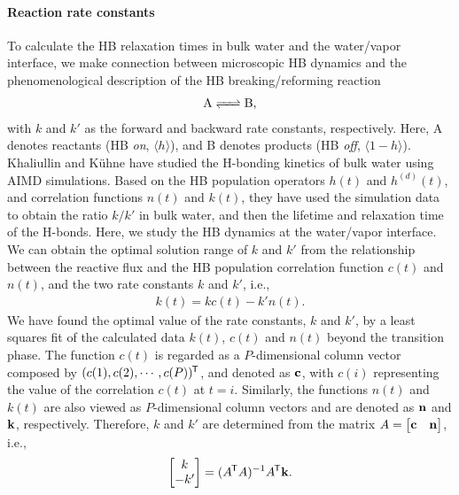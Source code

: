 \paragraph{Reaction rate constants}
To calculate the HB relaxation times in bulk water and the water/vapor interface, we
make connection between microscopic HB dynamics and the phenomenological description of the HB breaking/reforming reaction
\begin{align}
\ce{A <=> B},
\end{align}
with $k$ and $k'$ as the forward and backward rate constants, respectively.
Here, A denotes reactants (HB \emph{on}, $\langle h\rangle$), and B denotes products (HB \emph{off}, $\langle 1-h\rangle$)\cite{Chandra2000}.
Khaliullin and K\"uhne have studied the H-bonding kinetics of bulk water using AIMD simulations\cite{Khaliullin2013}.
Based on the HB population operators $h(t)$ and $h^{(d)}(t)$, and correlation functions $n(t)$ and $k(t)$, they have used the simulation data 
to obtain the ratio $k/k'$ in bulk water, and then the lifetime and relaxation time 
of the H-bonds.  
Here, we study the HB dynamics at the water/vapor interface.
We can obtain the optimal solution range of $k$ and $k'$ from the relationship between the reactive flux 
and the HB population correlation function $c(t)$ and $n(t)$, and the two rate constants $k$ and $k'$, i.e.,
\begin{eqnarray}
  k(t) = kc(t)-k'n(t).
\label{eq:fitting_k_rates}
\end{eqnarray}
We have found the optimal value of the rate constants, $k$ and $k'$, 
by a least squares fit of the calculated data $k(t)$, $c(t)$ and $n(t)$ beyond the transition phase.  
The function $c(t)$ is regarded as a $P$-dimensional column vector composed by $(c(1),c(2),\cdots,c(P)){^{\mkern-1.5mu\mathsf{T}}}$, and denoted as ${\bf c}$,
with $c(i)$ representing the value of the correlation $c(t)$ at $t=i$.
Similarly, the functions $n(t)$ and $k(t)$ are also viewed as $P$-dimensional column vectors and are denoted as ${\bf n}$ and ${\bf k}$, respectively.
Therefore, $k$ and $k'$ are determined from the matrix ${A} = \begin{bmatrix} {\bf c} & {\bf n} \end{bmatrix}$, i.e., 
\begin{equation}
\begin{bmatrix} k\\ -k' \end{bmatrix} = ({A}{^{\mkern-1.5mu\mathsf{T}}} {A})^{-1} {A}{^{\mkern-1.5mu\mathsf{T}}} {\bf k}. 
\end{equation}
